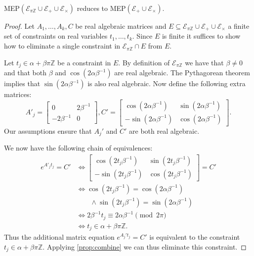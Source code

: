 \documentclass[format=acmsmall, review=false, screen=true]{acmart}
\newcommand{\Integers}{\mathbb{Z}}
\begin{document}
\begin{proposition}
  MEP$(\mathcal{E}_{\pi\Integers} \cup \mathcal{E}_{+} \cup
  \mathcal{E}_{\times})$ reduces to MEP$(\mathcal{E}_{+} \cup
  \mathcal{E}_{\times})$.
\label{lem:pi}
\end{proposition}
\begin{proof}
  Let $A_1,\ldots,A_k,C$ be real algebraic matrices and
  $E\subseteq \mathcal{E}_{\pi\Integers} \cup \mathcal{E}_{+} \cup
  \mathcal{E}_{\times}$
  a finite set of constraints on real variables $t_1,\ldots,t_k$.  Since $E$ is
  finite it suffices to show how to eliminate a single constraint
  in $\mathcal{E}_{\pi \Integers} \cap E$ from $E$.

  Let $t_{j}\in\alpha+\beta\pi\Integers$ be a constraint in $E$.  By definition
of  $\mathcal{E}_{\pi\Integers}$
we have
  that $\beta \neq 0$ and that both $\beta$ and $\cos(2\alpha\beta^{-1})$
   are real algebraic.  The Pythagorean theorem implies that $\sin(2\alpha\beta^{-1})$ is also real algebraic.  Now define the following extra
  matrices:
\[A'_j=\begin{bmatrix}0&2\beta^{-1}\\-2\beta^{-1}&0\end{bmatrix},
 C'=\begin{bmatrix}\cos(2\alpha\beta^{-1})&
\sin(2\alpha\beta^{-1})\\-\sin(2\alpha\beta^{-1})&\cos(2\alpha\beta^{-1})\end{bmatrix}.\]
Our assumptions ensure that $A_j'$ and $C'$ are both real algebraic.

We now have the following chain of equivalences:
\begin{align*}
e^{A'_j t_{j}}=C'
&\Leftrightarrow\begin{bmatrix}\cos(2t_{j}\beta^{-1})&
\sin(2t_{j}\beta^{-1})\\-\sin(2t_{j}\beta^{-1})&\cos(2t_{j}\beta^{-1})\end{bmatrix}
=C'\\
&\Leftrightarrow\cos(2t_{j}\beta^{-1})=\cos(2\alpha\beta^{-1}) \\
&\qquad\wedge\sin(2t_{j}\beta^{-1})=\sin(2\alpha\beta^{-1}) \\
  &\Leftrightarrow2\beta^{-1}t_{j}\equiv 2\alpha\beta^{-1} \pmod{2\pi} \\
&\Leftrightarrow t_{j}\in\alpha+\beta\pi\Integers.
\end{align*}
Thus the additional matrix equation $e^{A_j't_{j}}=C'$ is equivalent to
the constraint $t_{j}\in\alpha+\beta\pi\Integers$.  Applying
\cref{prop:combine} we can thus eliminate this constraint.
\end{proof}
\end{document}
